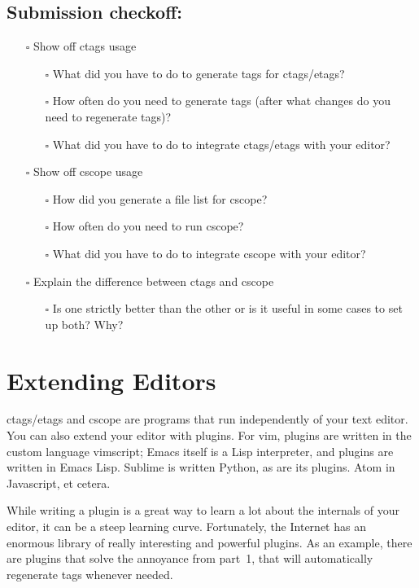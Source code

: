 \documentclass{article}
\begin{document}
\subsection*{Submission checkoff:}
\begin{itemize}
  \item[$\square$] Show off ctags usage
    \begin{itemize}
      \item[$\square$] What did you have to do to generate tags for ctags/etags?
      \item[$\square$] How often do you need to generate tags (after what
        changes do you need to regenerate tags)?
      \item[$\square$] What did you have to do to integrate ctags/etags with
        your editor?
    \end{itemize}
  \item[$\square$] Show off cscope usage
    \begin{itemize}
      \item[$\square$] How did you generate a file list for cscope?
      \item[$\square$] How often do you need to run cscope?
      \item[$\square$] What did you have to do to integrate cscope with your
        editor?
    \end{itemize}
  \item[$\square$] Explain the difference between ctags and cscope
    \begin{itemize}
      \item[$\square$] Is one strictly better than the other or is it useful
        in some cases to set up both? Why?
    \end{itemize}
\end{itemize}



\newpage
\section{Extending Editors}

ctags/etags and cscope are programs that run independently of your text
editor. You can also extend your editor with plugins. For vim, plugins are
written in the custom language vimscript; Emacs itself is a Lisp interpreter,
and plugins are written in Emacs Lisp. Sublime is written Python, as are its
plugins. Atom in Javascript, et cetera.

While writing a plugin is a great way to learn a lot about the internals of
your editor, it can be a steep learning curve. Fortunately, the Internet has
an enormous library of really interesting and powerful plugins.
As an example, there are plugins that solve the annoyance from part~1, that
will automatically regenerate tags whenever needed.
\end{document}
